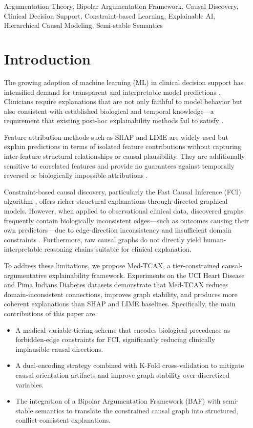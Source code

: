 \documentclass[conference, a4paper]{IEEEtran}
\begin{document}
\begin{IEEEkeywords}
 Argumentation Theory, Bipolar Argumentation Framework, Causal Discovery, Clinical Decision Support, Constraint-based Learning, Explainable AI, Hierarchical Causal Modeling, Semi-stable Semantics
\end{IEEEkeywords}


\section{Introduction}
The growing adoption of machine learning (ML) in clinical decision support has intensified demand for transparent and interpretable model predictions \cite{ref1}. Clinicians require explanations that are not only faithful to model behavior but also consistent with established biological and temporal knowledge—a requirement that existing post-hoc explainability methods fail to satisfy \cite{ref2}.

Feature-attribution methods such as SHAP \cite{ref3} and LIME \cite{ref4} are widely used but explain predictions in terms of isolated feature contributions without capturing inter-feature structural relationships or causal plausibility. They are additionally sensitive to correlated features and provide no guarantees against temporally reversed or biologically impossible attributions \cite{ref5}.

Constraint-based causal discovery, particularly the Fast Causal Inference (FCI) algorithm \cite{ref6}, offers richer structural explanations through directed graphical models. However, when applied to observational clinical data, discovered graphs frequently contain biologically inconsistent edges---such as outcomes causing their own predictors---due to edge-direction inconsistency and insufficient domain constraints \cite{ref7}. Furthermore, raw causal graphs do not directly yield human-interpretable reasoning chains suitable for clinical explanation.

To address these limitations, we propose Med-TCAX, a tier-constrained causal-argumentative explainability framework. Experiments on the UCI Heart Disease and Pima Indians Diabetes datasets demonstrate that Med-TCAX reduces domain-inconsistent connections, improves graph stability, and produces more coherent explanations than SHAP and LIME baselines. Specifically, the main contributions of this paper are:
\begin{itemize}
    \item A medical variable tiering scheme that encodes biological precedence as forbidden-edge constraints for FCI, significantly reducing clinically implausible causal directions.
    \item A dual-encoding strategy combined with K-Fold cross-validation to mitigate causal orientation artifacts and improve graph stability over discretized variables.
    \item The integration of a Bipolar Argumentation Framework (BAF) with semi-stable semantics to translate the constrained causal graph into structured, conflict-consistent explanations.
\end{itemize}
\end{document}
